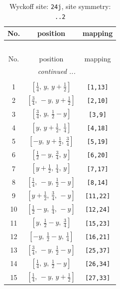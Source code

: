 \documentclass[fleqn,8pt]{jsarticle}
\begin{document}
\renewcommand{\arraystretch}{1.2}
\begin{longtable}{ccc}
\caption{Wyckoff site: {\tt 24j}, site symmetry: {\tt ..2}}
 \\
 \hline \hline
No. & position & mapping \\ \hline \endfirsthead

\multicolumn{2}{l}{\tablename\ \thetable{}} \\
 \hline \hline
No. & position & mapping \\ \hline \endhead

 \hline \hline
\multicolumn{2}{r}{\footnotesize\it continued ...} \\ \endfoot

 \hline \hline
\multicolumn{2}{r}{} \\ \endlastfoot

1 & $\left[ \frac{1}{4},\, y,\, y + \frac{1}{2} \right]$ & {\tt [1,13]} \\ \hline
2 & $\left[ \frac{3}{4},\, - y,\, y + \frac{1}{2} \right]$ & {\tt [2,10]} \\ \hline
3 & $\left[ \frac{3}{4},\, y,\, \frac{1}{2} - y \right]$ & {\tt [3,9]} \\ \hline
4 & $\left[ y,\, y + \frac{1}{2},\, \frac{1}{4} \right]$ & {\tt [4,18]} \\ \hline
5 & $\left[ - y,\, y + \frac{1}{2},\, \frac{3}{4} \right]$ & {\tt [5,19]} \\ \hline
6 & $\left[ \frac{1}{2} - y,\, \frac{3}{4},\, y \right]$ & {\tt [6,20]} \\ \hline
7 & $\left[ y + \frac{1}{2},\, \frac{1}{4},\, y \right]$ & {\tt [7,17]} \\ \hline
8 & $\left[ \frac{1}{4},\, - y,\, \frac{1}{2} - y \right]$ & {\tt [8,14]} \\ \hline
9 & $\left[ y + \frac{1}{2},\, \frac{3}{4},\, - y \right]$ & {\tt [11,22]} \\ \hline
10 & $\left[ \frac{1}{2} - y,\, \frac{1}{4},\, - y \right]$ & {\tt [12,24]} \\ \hline
11 & $\left[ y,\, \frac{1}{2} - y,\, \frac{3}{4} \right]$ & {\tt [15,23]} \\ \hline
12 & $\left[ - y,\, \frac{1}{2} - y,\, \frac{1}{4} \right]$ & {\tt [16,21]} \\ \hline
13 & $\left[ \frac{3}{4},\, - y,\, \frac{1}{2} - y \right]$ & {\tt [25,37]} \\ \hline
14 & $\left[ \frac{1}{4},\, y,\, \frac{1}{2} - y \right]$ & {\tt [26,34]} \\ \hline
15 & $\left[ \frac{1}{4},\, - y,\, y + \frac{1}{2} \right]$ & {\tt [27,33]} \\ \hline

\end{longtable}
\end{document}
